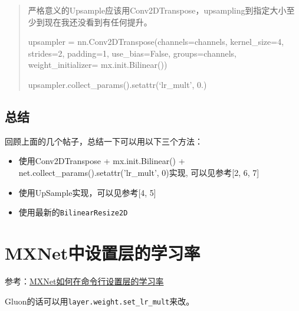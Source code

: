 \begin{quote}
严格意义的Upsample应该用Conv2DTranspose，upsampling到指定大小至少到现在我还没看到有任何提升。

upsampler = nn.Conv2DTranspose(channels=channels, 
		kernel\_size=4, strides=2, padding=1, use\_bias=False,
		groups=channels, weight\_initializer= mx.init.Bilinear()) 
		
upsampler.collect\_params().setattr(‘lr\_mult’, 0.)
\end{quote}

\subsection{总结}

回顾上面的几个帖子，总结一下可以用以下三个方法：
\begin{itemize}
\item 使用Conv2DTranspose + mx.init.Bilinear() + net.collect\_params().setattr('lr\_mult', 0)实现, 可以见参考[2, 6, 7]
\item 使用UpSample实现，可以见参考[4, 5]
\item 使用最新的\verb|BilinearResize2D|
\end{itemize}


\section{MXNet中设置层的学习率}

参考：\href{https://discuss.gluon.ai/t/topic/6636}{MXNet如何在命令行设置层的学习率}

Gluon的话可以用\verb|layer.weight.set_lr_mult|来改。













